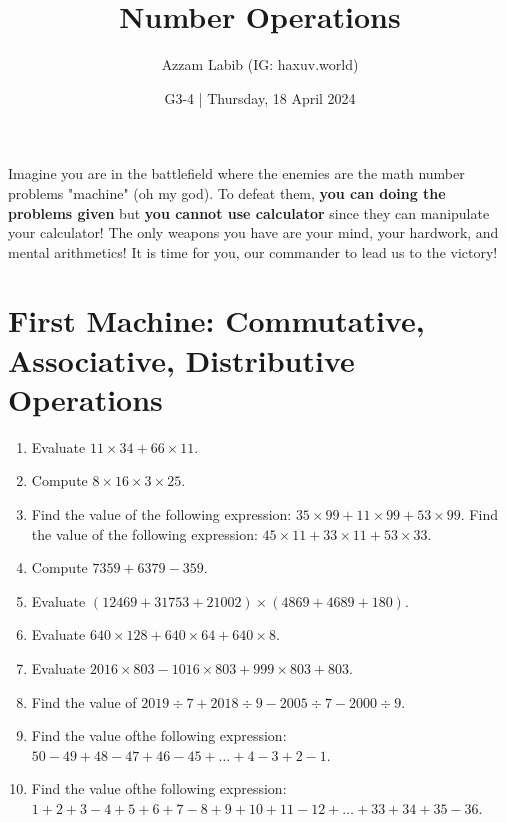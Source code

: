 \documentclass[11pt]{scrartcl}
\title{Number Operations}
\author{Azzam Labib (IG: haxuv.world)}
\date{G3-4 | Thursday, 18 April 2024}
\begin{document}
\maketitle
\begin{tcolorbox}[colback=blue!10,colframe=blue!75!black]
Imagine you are in the battlefield where the enemies are the math number problems "machine" (oh my god). To defeat them, \textbf{you can doing the problems given} but \textbf{you cannot use calculator} since they can manipulate your calculator! The only weapons you have are your mind, your hardwork, and mental arithmetics! It is time for you, our commander to lead us to the victory!
\end{tcolorbox}




\section{First Machine: Commutative, Associative, Distributive Operations}
\begin{enumerate}
\item Evaluate $11 \times 34 + 66 \times 11$.
\item Compute $8 \times 16 \times 3 \times 25$.
\item Find the value of the following expression: $35 \times 99 + 11 \times 99 + 53 \times 99$.
Find the value of the following expression: $45 \times 11 + 33 \times 11 + 53 \times 33$.
\item Compute $7359 + 6379 - 359$.
\item Evaluate
$(12469+31753+21002) \times (4869+4689+180)$.
\item Evaluate $640 \times 128 + 640 \times 64 + 640 \times 8$.
\item Evaluate $2016 \times 803 - 1016 \times 803 + 999 \times 803 + 803$.
\item Find the value of $2019 \div 7 + 2018 \div 9 - 2005 \div 7 - 2000 \div 9$.
\item Find the value ofthe following expression:
$50-49+48-47+46-45+\dots+4-3+2-1$.
\item Find the value ofthe following expression:\\
$1+2+3-4+5+6+7-8+9+10+11-12+\dots+33+34+35-36$.
\end{enumerate}
\end{document}

